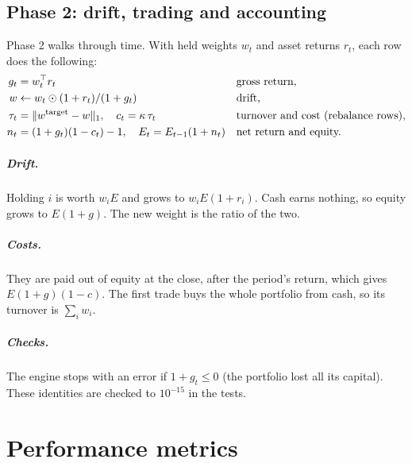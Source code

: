\section{Phase 2: drift, trading and accounting}
Phase 2 walks through time. With held weights $w_t$ and asset returns $r_t$, each row does
the following:
\begin{align*}
  g_t&=w_t^\top r_t &&\text{gross return,}\\
  w&\leftarrow w_t\odot(1+r_t)/(1+g_t) &&\text{drift,}\\
  \tau_t&=\lVert w^{\text{target}}-w\rVert_1,\quad c_t=\kappa\,\tau_t &&\text{turnover and cost (rebalance rows),}\\
  n_t&=(1+g_t)(1-c_t)-1,\quad E_t=E_{t-1}(1+n_t) &&\text{net return and equity.}
\end{align*}
\paragraph{Drift.} Holding $i$ is worth $w_iE$ and grows to $w_iE(1+r_i)$. Cash earns
nothing, so equity grows to $E(1+g)$. The new weight is the ratio of the two.

\paragraph{Costs.} They are paid out of equity at the close, after the period's return,
which gives $E(1+g)(1-c)$. The first trade buys the whole portfolio from cash, so its
turnover is $\sum_iw_i$.

\paragraph{Checks.} The engine stops with an error if $1+g_t\le0$ (the portfolio lost all
its capital). These identities are checked to $10^{-15}$ in the tests.

\chapter{Performance metrics}\label{c:sec:metrics}


